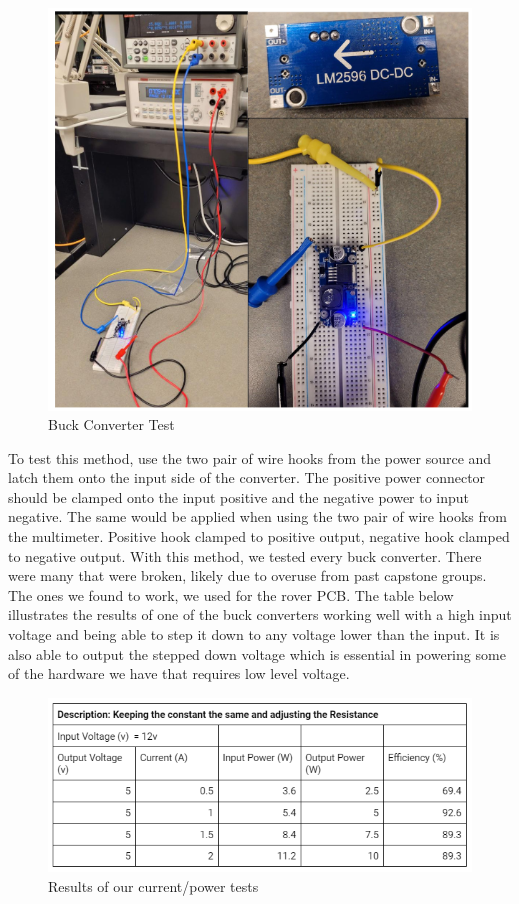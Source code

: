 \documentclass[a4paper, 10pt]{article}
\begin{document}
		\begin{figure} [!h]
			\centering
			\includegraphics[scale=0.7]{Photos/LM2956 Testing Picture}
			\caption{Buck Converter Test}
			\label{buck_test}
		\end{figure}

	To test this method, use the two pair of wire hooks from the power source and latch them onto the input side of the converter. The positive power connector should be clamped onto the input positive and the negative power to input negative. The same would be applied when using the two pair of wire hooks from the multimeter. Positive hook clamped to positive output, negative hook clamped to negative output. With this method, we tested every buck converter. There were many that were broken, likely due to overuse from past capstone groups. The ones we found to work, we used for the rover PCB. The table below illustrates the results of one of the buck converters working well with a high input voltage and being able to step it down to any voltage lower than the input. It is also able to output the stepped down voltage which is essential in powering some of the hardware we have that requires low level voltage.

		\begin{figure} [!h]
			\centering
			\includegraphics[scale=0.9]{Photos/Buck Converter Data}
			\caption{Results of our current/power tests}
			\label{Buck Converted Data}
		\end{figure}
\end{document}
